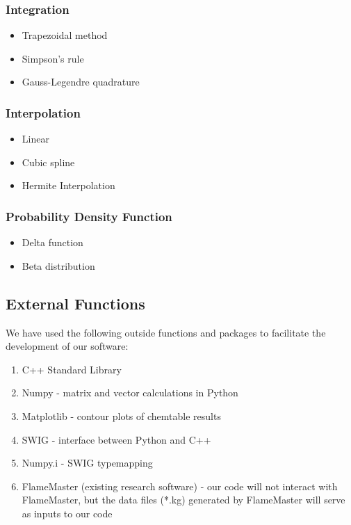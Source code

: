 \documentclass[11pt]{article}
\begin{document}
\subsubsection{Integration}
\begin{itemize}
\item Trapezoidal method
\item Simpson’s rule
\item Gauss-Legendre quadrature
\end{itemize}

\subsubsection{Interpolation}
\begin{itemize}
\item Linear
\item Cubic spline
\item Hermite Interpolation
\end{itemize}

\subsubsection{Probability Density Function}
\begin{itemize}
\item Delta function
\item Beta distribution
\end{itemize}


\subsection{External Functions}

We have used the following outside functions and packages to facilitate the development of our software:
\begin{enumerate} 
\item C++ Standard Library
\item Numpy - matrix and vector calculations in Python
\item Matplotlib - contour plots of chemtable results
\item SWIG - interface between Python and C++
\item Numpy.i - SWIG typemapping
\item FlameMaster (existing research software) - our code will not interact with FlameMaster, but the data files (*.kg) generated by FlameMaster will serve as inputs to our code
\end{enumerate}
\end{document}
